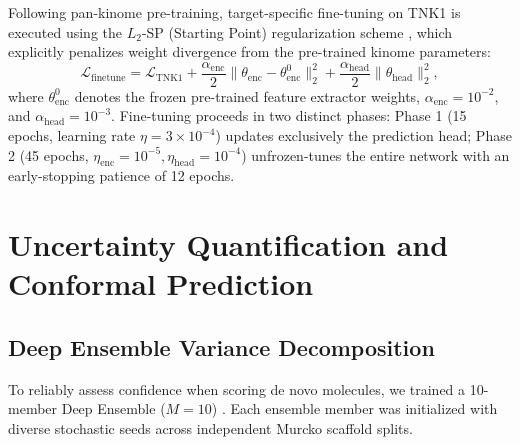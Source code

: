 \documentclass[journal]{IEEEtran}
\begin{document}
Following pan-kinome pre-training, target-specific fine-tuning on TNK1 is executed using the $L_2$-SP (Starting Point) regularization scheme \cite{xuhong2018explicit}, which explicitly penalizes weight divergence from the pre-trained kinome parameters:
\begin{equation}
    \mathcal{L}_{\text{finetune}} = \mathcal{L}_{\text{TNK1}} + \frac{\alpha_{\text{enc}}}{2}\|\theta_{\text{enc}} - \theta_{\text{enc}}^0\|_2^2 + \frac{\alpha_{\text{head}}}{2}\|\theta_{\text{head}}\|_2^2,
\end{equation}
where $\theta_{\text{enc}}^0$ denotes the frozen pre-trained feature extractor weights, $\alpha_{\text{enc}} = 10^{-2}$, and $\alpha_{\text{head}} = 10^{-3}$. Fine-tuning proceeds in two distinct phases: Phase 1 (15 epochs, learning rate $\eta = 3 \times 10^{-4}$) updates exclusively the prediction head; Phase 2 (45 epochs, $\eta_{\text{enc}} = 10^{-5}, \eta_{\text{head}} = 10^{-4}$) unfrozen-tunes the entire network with an early-stopping patience of 12 epochs.

\section{Uncertainty Quantification and Conformal Prediction}

\subsection{Deep Ensemble Variance Decomposition}
To reliably assess confidence when scoring de novo molecules, we trained a 10-member Deep Ensemble ($M = 10$) \cite{lakshminarayanan2017simple}. Each ensemble member was initialized with diverse stochastic seeds across independent Murcko scaffold splits. 
\end{document}

